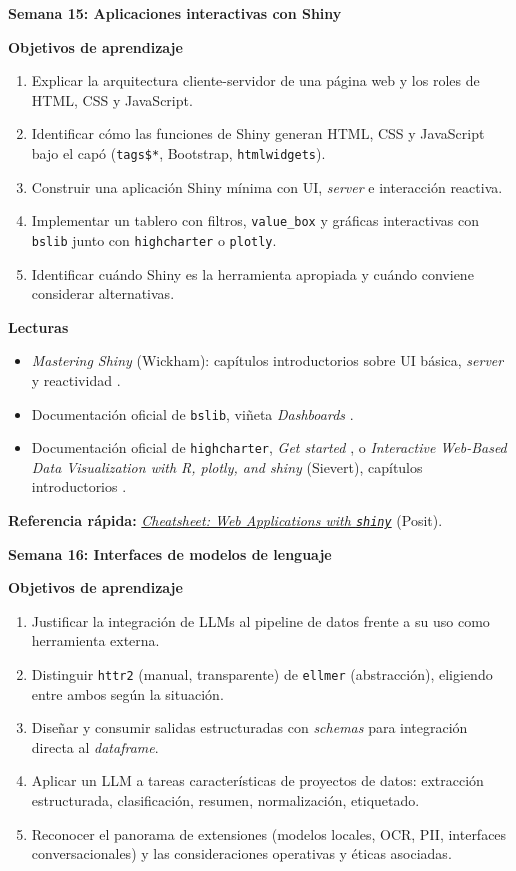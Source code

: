 \documentclass[11pt,letterpaper]{article}
\newcommand{\semana}[2]{%
  \bigskip%
  {\color{main}\Large\bfseries Semana #1: #2\par}%
  \smallskip%
}
\newcommand{\cheatsheet}[2]{%
  \href{https://rstudio.github.io/cheatsheets/#1.pdf}{\textit{Cheatsheet: #2}}%
}
\begin{document}
\semana{15}{Aplicaciones interactivas con Shiny}

\medskip
\noindent\textbf{Objetivos de aprendizaje}
\begin{enumerate}[leftmargin=*, itemsep=1pt]
    \item Explicar la arquitectura cliente-servidor de una página web y los roles de HTML, CSS y JavaScript.
    \item Identificar cómo las funciones de Shiny generan HTML, CSS y JavaScript bajo el capó (\texttt{tags\$*}, Bootstrap, \texttt{htmlwidgets}).
    \item Construir una aplicación Shiny mínima con UI, \textit{server} e interacción reactiva.
    \item Implementar un tablero con filtros, \texttt{value\_box} y gráficas interactivas con \texttt{bslib} junto con \texttt{highcharter} o \texttt{plotly}.
    \item Identificar cuándo Shiny es la herramienta apropiada y cuándo conviene considerar alternativas.
\end{enumerate}

\medskip
\noindent\textbf{Lecturas}
\begin{itemize}[leftmargin=*, itemsep=1pt]
    \item \textit{Mastering Shiny} (Wickham): capítulos introductorios sobre UI básica, \textit{server} y reactividad \cite{wickham2021mastering-shiny}.
    \item Documentación oficial de \texttt{bslib}, viñeta \textit{Dashboards} \cite{bslib-docs}.
    \item Documentación oficial de \texttt{highcharter}, \textit{Get started} \cite{kunst-highcharter}, o \textit{Interactive Web-Based Data Visualization with R, plotly, and shiny} (Sievert), capítulos introductorios \cite{sievert-plotly}.
\end{itemize}

\medskip
\noindent\textbf{Referencia rápida:} \cheatsheet{shiny}{Web Applications with \texttt{shiny}} (Posit).

\semana{16}{Interfaces de modelos de lenguaje}

\medskip
\noindent\textbf{Objetivos de aprendizaje}
\begin{enumerate}[leftmargin=*, itemsep=1pt]
    \item Justificar la integración de LLMs al pipeline de datos frente a su uso como herramienta externa.
    \item Distinguir \texttt{httr2} (manual, transparente) de \texttt{ellmer} (abstracción), eligiendo entre ambos según la situación.
    \item Diseñar y consumir salidas estructuradas con \textit{schemas} para integración directa al \textit{dataframe}.
    \item Aplicar un LLM a tareas características de proyectos de datos: extracción estructurada, clasificación, resumen, normalización, etiquetado.
    \item Reconocer el panorama de extensiones (modelos locales, OCR, PII, interfaces conversacionales) y las consideraciones operativas y éticas asociadas.
\end{enumerate}
\end{document}
